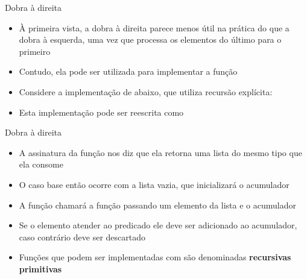 \begin{frame}[fragile]{Dobra à direita}

    \begin{itemize}
        \item À primeira vista, a dobra à direita parece menos útil na prática do que a dobra à
            esquerda, uma vez que processa os elementos do último para o primeiro

        \item Contudo, ela pode ser utilizada para implementar a função 

        \item Considere a implementação de  abaixo, que utiliza recursão
            explícita:


        \item Esta implementação pode ser reescrita como

    \end{itemize}

\end{frame}

\begin{frame}[fragile]{Dobra à direita}

    \begin{itemize}
        \item A assinatura da função  nos diz que ela retorna uma lista
            do mesmo tipo que ela consome

        \item O caso base então ocorre com a lista vazia, que inicializará o acumulador

        \item A função  chamará a função  passando um
            elemento da lista e o acumulador

        \item Se o elemento atender ao predicado  ele deve ser adicionado ao
            acumulador, caso contrário deve ser descartado

        \item Funções que podem ser implementadas com  são denominadas
            \textbf{recursivas primitivas}

    \end{itemize}

\end{frame}


